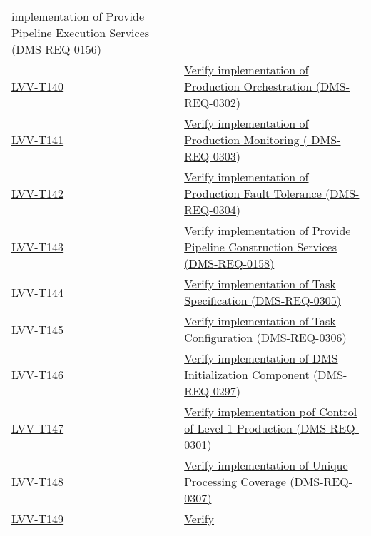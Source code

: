 \begin{longtable}[]{p{3cm}p{13cm}}
{implementation of Provide Pipeline Execution Services
(DMS-REQ-0156)}\tabularnewline
\protect\hyperlink{lvv-t140---verify-implementation-of-production-orchestration--dms-req-0302}{LVV-T140}
&
\href{https://jira.lsstcorp.org/secure/Tests.jspa\#/testCase/LVV-T140}{Verify
implementation of Production Orchestration
(DMS-REQ-0302)}\tabularnewline
\protect\hyperlink{lvv-t141---verify-implementation-of-production-monitoring--dms-req-0303}{LVV-T141}
&
\href{https://jira.lsstcorp.org/secure/Tests.jspa\#/testCase/LVV-T141}{Verify
implementation of Production Monitoring ( DMS-REQ-0303)}\tabularnewline
\protect\hyperlink{lvv-t142---verify-implementation-of-production-fault-tolerance-dms-req-0304}{LVV-T142}
&
\href{https://jira.lsstcorp.org/secure/Tests.jspa\#/testCase/LVV-T142}{Verify
implementation of Production Fault Tolerance
(DMS-REQ-0304)}\tabularnewline
\protect\hyperlink{lvv-t143---verify-implementation-of-provide-pipeline-construction-services-dms-req-0158}{LVV-T143}
&
\href{https://jira.lsstcorp.org/secure/Tests.jspa\#/testCase/LVV-T143}{Verify
implementation of Provide Pipeline Construction Services
(DMS-REQ-0158)}\tabularnewline
\protect\hyperlink{lvv-t144---verify-implementation-of-task-specification-dms-req-0305}{LVV-T144}
&
\href{https://jira.lsstcorp.org/secure/Tests.jspa\#/testCase/LVV-T144}{Verify
implementation of Task Specification (DMS-REQ-0305)}\tabularnewline
\protect\hyperlink{lvv-t145---verify-implementation-of-task-configuration-dms-req-0306}{LVV-T145}
&
\href{https://jira.lsstcorp.org/secure/Tests.jspa\#/testCase/LVV-T145}{Verify
implementation of Task Configuration (DMS-REQ-0306)}\tabularnewline
\protect\hyperlink{lvv-t146---verify-implementation-of-dms-initialization-component-dms-req-0297}{LVV-T146}
&
\href{https://jira.lsstcorp.org/secure/Tests.jspa\#/testCase/LVV-T146}{Verify
implementation of DMS Initialization Component
(DMS-REQ-0297)}\tabularnewline
\protect\hyperlink{lvv-t147---verify-implementation-pof-control-of-level-1-production-dms-req-0301}{LVV-T147}
&
\href{https://jira.lsstcorp.org/secure/Tests.jspa\#/testCase/LVV-T147}{Verify
implementation pof Control of Level-1 Production
(DMS-REQ-0301)}\tabularnewline
\protect\hyperlink{lvv-t148---verify-implementation-of-unique-processing-coverage-dms-req-0307}{LVV-T148}
&
\href{https://jira.lsstcorp.org/secure/Tests.jspa\#/testCase/LVV-T148}{Verify
implementation of Unique Processing Coverage
(DMS-REQ-0307)}\tabularnewline
\protect\hyperlink{lvv-t149---verify-implementation-of-catalog-queries-dms-req-0075}{LVV-T149}
&
\href{https://jira.lsstcorp.org/secure/Tests.jspa\#/testCase/LVV-T149}{Verify
}
\end{longtable}
